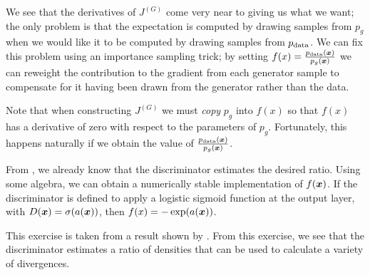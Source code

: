 We see that the derivatives of $J^{(G)}$ come very near to giving us what we want; the only problem is that
the expectation is computed by drawing samples from $p_g$ when we would like it to be computed by drawing
samples from $p_{\rm{data}}$.
We can fix this problem using an importance sampling trick; by setting $f(x) = \frac{p_{\rm{data}}({\bm{x}})}{p_g({\bm{x}})}$
we can reweight the contribution to the gradient from each generator sample to compensate for it having
been drawn from the generator rather than the data.

Note that when constructing $J^{(G)}$ we must {\em copy} $p_g$ into $f(x)$ so that $f(x)$ has a derivative of
zero with respect to the parameters of $p_g$.
Fortunately, this happens naturally if we obtain the value of $\frac{p_{\rm{data}}({\bm{x}})}{p_g({\bm{x}})}$.

From , we already know that the discriminator estimates the desired ratio.
Using some algebra, we can obtain a numerically stable implementation of $f({\bm{x}})$.
If the discriminator is defined to apply a logistic sigmoid function at the output layer,
with $D({\bm{x}}) = \sigma( a({\bm{x}}) )$, then $f(x) = - \exp(a({\bm{x}}))$.

This exercise is taken from a result shown by \citet{Goodfellow-ICLR2015}.
From this exercise, we see that the discriminator estimates a ratio of densities
that can be used to calculate a variety of divergences.
